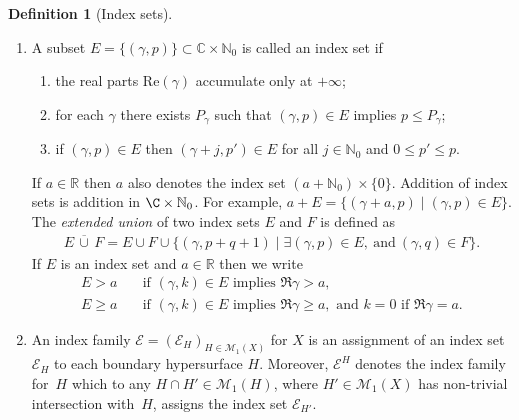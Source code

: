 \documentclass[JEP,XML,SOM,Unicode,NoFloatCountersInSection,published]{cedram}
\theoremstyle{plain}
\theoremstyle{definition}
\newtheorem{defn}[Th]{Definition}
\newcommand {\N}{\mathbb{N}}
\newcommand{\R}{{\mathbb{R}}}
\newcommand\calE{{\mathcal E}}
\newcommand\calM{{\mathcal M}}
\begin{document}
\skpt
\begin{defn}[Index sets]
\begin{enumerate}
\item
A subset $E =\{(\gamma,p)\} \subset \mathbb{C}\times \mathbb{N}_{0}$
is called an index set if
\begin{enumerate}
\item
the real parts $\text{Re}(\gamma)$ accumulate only at $+\infty$;
\item
for each $\gamma$ there exists $P_{\gamma}$ such that
$(\gamma, p) \in E$ implies $ p \leq P_{\gamma}$;
\item
if $(\gamma, p) \in E$ then $(\gamma + j, p') \in E$
for all $ j \in \mathbb{N}_{0}$ and $0 \leq p' \leq p$.
\end{enumerate}
If $a\in\R$ then $a$ also denotes the index set $(a+\N_0)\times\{0\}$.
Addition of index sets is addition in $\C\times\N_0$.
For example, $a+E=\{(\gamma+a,p)\mid (\gamma,p)\in E\}$.
The \emph{extended union} of two index sets
$E$ and $F$ is defined as
\begin{align}
\label{extended}
E \,\overline{\cup} \,F = E \cup F \cup \{(\gamma, p + q + 1)\mid \exists (\gamma,p) \in E,\
\mbox{and}\ (\gamma,q) \in F \}.
\end{align}
If $E$ is an index set and $a\in\R$ then we write
\begin{align*}
E>a &\quad\text{if } (\gamma,k)\in E \text{ implies } \Re \gamma>a, \\
E\geq a &\quad\text{if } (\gamma,k)\in E \text{ implies } \Re \gamma\geq a, \text{ and $k=0$ if $\Re \gamma=a$}.
\end{align*}
\item
An index family $\calE = (\calE_H)_{H\in\calM_1(X)}$ for $X$ is an assignment of an index set~$\calE_H$ to each boundary hypersurface $H$.
Moreover, $\calE^H$ denotes the index family for~$H$ which to any $H\cap H'\in\calM_1(H)$, where $H'\in\calM_1(X)$ has non-trivial intersection with~$H$,
assigns the index set $\calE_{H'}$.
\end{enumerate}
\end{defn}
\end{document}
